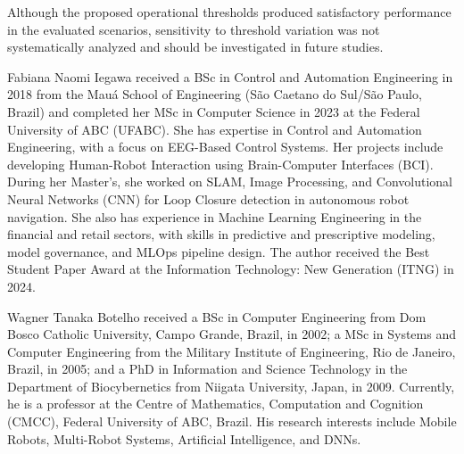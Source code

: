 \documentclass{ieeeaccess}
\begin{document}
Although the proposed operational thresholds produced satisfactory performance in the evaluated scenarios, sensitivity to threshold variation was not systematically analyzed and should be investigated in future studies.


\makeatletter
\let\kittiSotaOriginalBibitem\bibitem
\renewcommand{\bibitem}[2][]{%
  \def\kittiSotaCurrentBibKey{#2}%
  \def\kittiSotaDbowBibKey{GalvezLopez2012DBoW2}%
  \def\kittiSotaNetvladBibKey{Arandjelovic2016NetVLAD}%
  \ifx\kittiSotaCurrentBibKey\kittiSotaDbowBibKey
    \color{red}%
  \else\ifx\kittiSotaCurrentBibKey\kittiSotaNetvladBibKey
    \color{red}%
  \else
    \color{black}%
  \fi\fi
  \if\relax\detokenize{#1}\relax
    \kittiSotaOriginalBibitem{#2}%
  \else
    \kittiSotaOriginalBibitem[#1]{#2}%
  \fi
}
\makeatother

\color{black}

\begin{IEEEbiographynophoto}{Fabiana Naomi Iegawa} received a BSc in Control and Automation Engineering in 2018 from the Mauá School of Engineering (São Caetano do Sul/São Paulo, Brazil) and completed her MSc in Computer Science in 2023 at the Federal University of ABC (UFABC). She has expertise in Control and Automation Engineering, with a focus on EEG-Based Control Systems. Her projects include developing Human-Robot Interaction using Brain-Computer Interfaces (BCI). During her Master's, she worked on SLAM, Image Processing, and Convolutional Neural Networks (CNN) for Loop Closure detection in autonomous robot navigation. She also has experience in Machine Learning Engineering in the financial and retail sectors, with skills in predictive and prescriptive modeling, model governance, and MLOps pipeline design. The author received the Best Student Paper Award at the Information Technology: New Generation (ITNG) in 2024.
\end{IEEEbiographynophoto}

\begin{IEEEbiographynophoto}{Wagner Tanaka Botelho} received a BSc in Computer Engineering from Dom Bosco Catholic University, Campo Grande, Brazil, in 2002; a MSc in Systems and Computer Engineering from the Military Institute of Engineering, Rio de Janeiro, Brazil, in 2005; and a PhD in Information and Science Technology in the Department of Biocybernetics from Niigata University, Japan, in 2009. Currently, he is a professor at the Centre of Mathematics, Computation and Cognition (CMCC), Federal University of ABC, Brazil. His research interests include Mobile Robots, Multi-Robot Systems, Artificial Intelligence, and DNNs.
\end{IEEEbiographynophoto}
\end{document}
